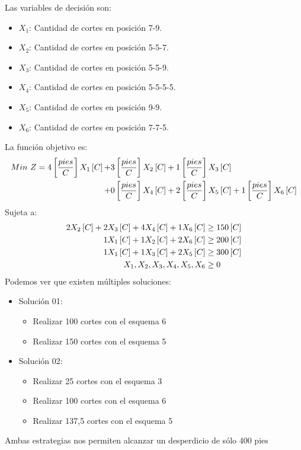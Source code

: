 \documentclass{tarea}
\begin{document}
\begin{homeworkProblem}
Las variables de decisión son:
\begin{itemize}
	\item $X_1$: Cantidad de cortes en posición 7-9.
	\item $X_2$: Cantidad de cortes en posición 5-5-7.
	\item $X_3$: Cantidad de cortes en posición 5-5-9.
	\item $X_4$: Cantidad de cortes en posición 5-5-5-5.
	\item $X_5$: Cantidad de cortes en posición 9-9.
	\item $X_6$: Cantidad de cortes en posición 7-7-5.
\end{itemize}
La función objetivo es: 
\begin{align*}
	Min\ Z = 4\left[ \frac{pies}{C} \right]X_1\left[ C \right] + &3\left[ \frac{pies}{C} \right]X_2\left[ C \right] + 1\left[ \frac{pies}{C} \right]X_3\left[ C \right] \\ + &0\left[ \frac{pies}{C} \right]X_4\left[ C \right] + 2\left[ \frac{pies}{C} \right]X_5\left[ C \right] +1\left[ \frac{pies}{C} \right]X_6\left[ C \right]
\end{align*}
Sujeta a:
\begin{align*}
	2X_2\left[ C \right] +2X_3\left[ C \right] +4X_4\left[ C \right] + 1X_6\left[ C \right] &\ge 150\left[ C \right] \\
	1X_1\left[ C \right] + 1X_2\left[ C \right] + 2X_6\left[ C \right] &\ge 200\left[ C \right] \\
	1X_1\left[ C \right] + 1X_3\left[ C \right] + 2X_5\left[ C \right] &\ge 300\left[ C \right] \\
	X_1,X_2,X_3,X_4,X_5, X_6 &\ge 0
\end{align*}
Podemos ver que existen múltiples soluciones:
\begin{itemize}
	\item Solución 01:
	\begin{itemize}
		\item Realizar 100 cortes con el esquema 6
		\item Realizar 150 cortes con el esquema 5
	\end{itemize}
	\item Solución 02:
	\begin{itemize}
		\item Realizar 25 cortes con el esquema 3
		\item Realizar 100 cortes con el esquema 6
		\item Realizar 137,5 cortes con el esquema 5
	\end{itemize}
\end{itemize}
Ambas estrategias nos permiten alcanzar un desperdicio de sólo 400 pies
\end{homeworkProblem}
\end{document}
